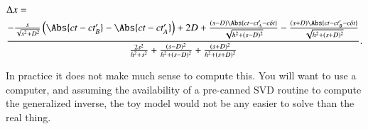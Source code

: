 \begin{equation}\label{eqn:relativisticElectrodynamicsA1:400}
\begin{aligned}
&\Delta x = \\
&\frac{
   -\frac{s}{\sqrt{s^2 + D^2}} \left( \Abs{ ct - c t_B' } - \Abs{ c t - c t_A'} \right) +2 D
   + \frac{(s - D)\Abs{c t - c t_A' - c \delta t} }{ \sqrt{ h^2 + (s - D)^2 } }
   - \frac{(s + D)\Abs{c t - c t_B' - c \delta t} }{ \sqrt{ h^2 + (s + D)^2 } } }
{
   \frac{2 s^2}{h^2 + s^2}
   +\frac{(s - D)^2}{h^2 + (s -D)^2}
   +\frac{(s + D)^2}{h^2 + (s +D)^2}
}.
\end{aligned}
\end{equation}

In practice it does not make much sense to compute this.  You will want to use a computer, and assuming the availability of a pre-canned SVD routine to compute the generalized inverse, the toy model would not be any easier to solve than the real thing.

%
%
%

